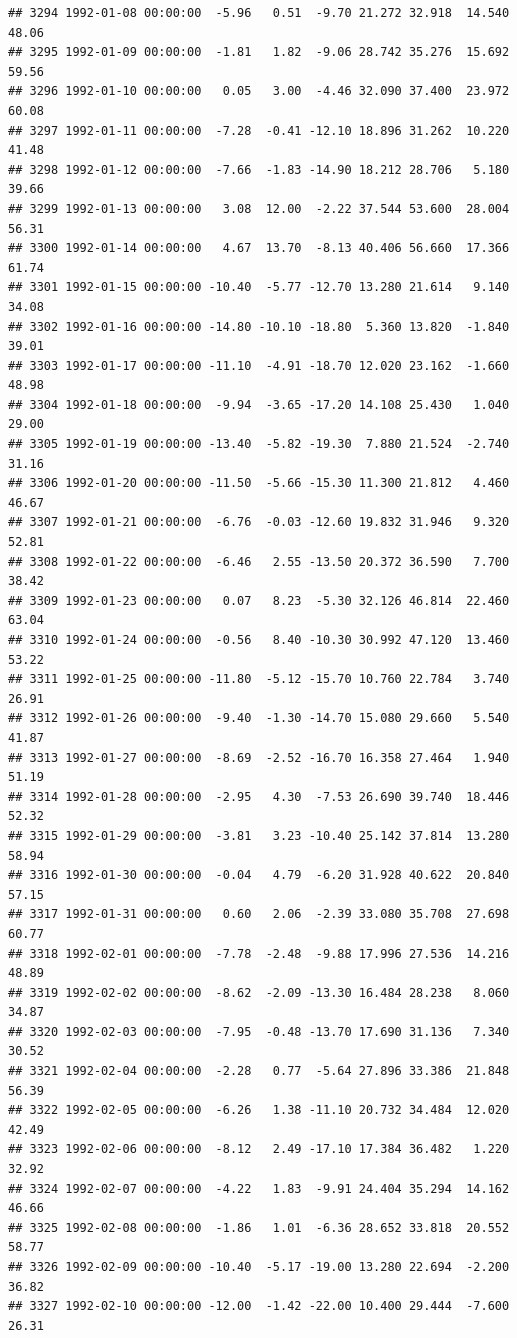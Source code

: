 \documentclass{article}\usepackage{graphicx, color}
\makeatletter
\newenvironment{kframe}{%
 \def\at@end@of@kframe{}%
 \ifinner\ifhmode%
  \def\at@end@of@kframe{\end{minipage}}%
  \begin{minipage}{\columnwidth}%
 \fi\fi%
 \def\FrameCommand##1{\hskip\@totalleftmargin \hskip-\fboxsep
 \colorbox{shadecolor}{##1}\hskip-\fboxsep
     \hskip-\linewidth \hskip-\@totalleftmargin \hskip\columnwidth}%
 \MakeFramed {\advance\hsize-\width
   \@totalleftmargin\z@ \linewidth\hsize
   \@setminipage}}%
 {\par\unskip\endMakeFramed%
 \at@end@of@kframe}
\newenvironment{knitrout}{}{} %
\makeatother
\begin{document}
\begin{knitrout}
\begin{kframe}
\begin{verbatim}
## 3294 1992-01-08 00:00:00  -5.96   0.51  -9.70 21.272 32.918  14.540  48.06
## 3295 1992-01-09 00:00:00  -1.81   1.82  -9.06 28.742 35.276  15.692  59.56
## 3296 1992-01-10 00:00:00   0.05   3.00  -4.46 32.090 37.400  23.972  60.08
## 3297 1992-01-11 00:00:00  -7.28  -0.41 -12.10 18.896 31.262  10.220  41.48
## 3298 1992-01-12 00:00:00  -7.66  -1.83 -14.90 18.212 28.706   5.180  39.66
## 3299 1992-01-13 00:00:00   3.08  12.00  -2.22 37.544 53.600  28.004  56.31
## 3300 1992-01-14 00:00:00   4.67  13.70  -8.13 40.406 56.660  17.366  61.74
## 3301 1992-01-15 00:00:00 -10.40  -5.77 -12.70 13.280 21.614   9.140  34.08
## 3302 1992-01-16 00:00:00 -14.80 -10.10 -18.80  5.360 13.820  -1.840  39.01
## 3303 1992-01-17 00:00:00 -11.10  -4.91 -18.70 12.020 23.162  -1.660  48.98
## 3304 1992-01-18 00:00:00  -9.94  -3.65 -17.20 14.108 25.430   1.040  29.00
## 3305 1992-01-19 00:00:00 -13.40  -5.82 -19.30  7.880 21.524  -2.740  31.16
## 3306 1992-01-20 00:00:00 -11.50  -5.66 -15.30 11.300 21.812   4.460  46.67
## 3307 1992-01-21 00:00:00  -6.76  -0.03 -12.60 19.832 31.946   9.320  52.81
## 3308 1992-01-22 00:00:00  -6.46   2.55 -13.50 20.372 36.590   7.700  38.42
## 3309 1992-01-23 00:00:00   0.07   8.23  -5.30 32.126 46.814  22.460  63.04
## 3310 1992-01-24 00:00:00  -0.56   8.40 -10.30 30.992 47.120  13.460  53.22
## 3311 1992-01-25 00:00:00 -11.80  -5.12 -15.70 10.760 22.784   3.740  26.91
## 3312 1992-01-26 00:00:00  -9.40  -1.30 -14.70 15.080 29.660   5.540  41.87
## 3313 1992-01-27 00:00:00  -8.69  -2.52 -16.70 16.358 27.464   1.940  51.19
## 3314 1992-01-28 00:00:00  -2.95   4.30  -7.53 26.690 39.740  18.446  52.32
## 3315 1992-01-29 00:00:00  -3.81   3.23 -10.40 25.142 37.814  13.280  58.94
## 3316 1992-01-30 00:00:00  -0.04   4.79  -6.20 31.928 40.622  20.840  57.15
## 3317 1992-01-31 00:00:00   0.60   2.06  -2.39 33.080 35.708  27.698  60.77
## 3318 1992-02-01 00:00:00  -7.78  -2.48  -9.88 17.996 27.536  14.216  48.89
## 3319 1992-02-02 00:00:00  -8.62  -2.09 -13.30 16.484 28.238   8.060  34.87
## 3320 1992-02-03 00:00:00  -7.95  -0.48 -13.70 17.690 31.136   7.340  30.52
## 3321 1992-02-04 00:00:00  -2.28   0.77  -5.64 27.896 33.386  21.848  56.39
## 3322 1992-02-05 00:00:00  -6.26   1.38 -11.10 20.732 34.484  12.020  42.49
## 3323 1992-02-06 00:00:00  -8.12   2.49 -17.10 17.384 36.482   1.220  32.92
## 3324 1992-02-07 00:00:00  -4.22   1.83  -9.91 24.404 35.294  14.162  46.66
## 3325 1992-02-08 00:00:00  -1.86   1.01  -6.36 28.652 33.818  20.552  58.77
## 3326 1992-02-09 00:00:00 -10.40  -5.17 -19.00 13.280 22.694  -2.200  36.82
## 3327 1992-02-10 00:00:00 -12.00  -1.42 -22.00 10.400 29.444  -7.600  26.31

\end{verbatim}
\end{kframe}
\end{knitrout}
\end{document}
